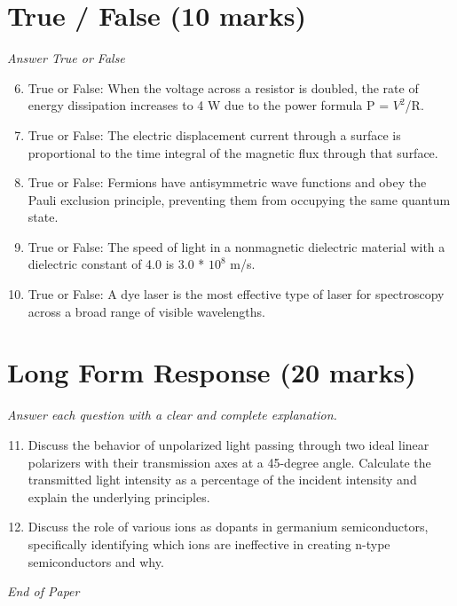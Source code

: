 \documentclass[12pt]{article}
\begin{document}
\section*{True / False (10 marks)}
\textit{Answer True or False}
\begin{enumerate}[label=\arabic*.]
\setcounter{enumi}{5}
\item True or False: When the voltage across a resistor is doubled, the rate of energy dissipation increases to 4 W due to the power formula P = $V^2$/R.
\item True or False: The electric displacement current through a surface is proportional to the time integral of the magnetic flux through that surface.
\item True or False: Fermions have antisymmetric wave functions and obey the Pauli exclusion principle, preventing them from occupying the same quantum state.
\item True or False: The speed of light in a nonmagnetic dielectric material with a dielectric constant of 4.0 is 3.0 * $10^8$ m/s.
\item True or False: A dye laser is the most effective type of laser for spectroscopy across a broad range of visible wavelengths.
\end{enumerate}

\section*{Long Form Response (20 marks)}
\textit{Answer each question with a clear and complete explanation.}
\begin{enumerate}[label=\arabic*.]
\setcounter{enumi}{10}
\item Discuss the behavior of unpolarized light passing through two ideal linear polarizers with their transmission axes at a 45-degree angle. Calculate the transmitted light intensity as a percentage of the incident intensity and explain the underlying principles.
\item Discuss the role of various ions as dopants in germanium semiconductors, specifically identifying which ions are ineffective in creating n-type semiconductors and why.
\end{enumerate}

\vfill
\noindent\textit{End of Paper}
\end{document}

